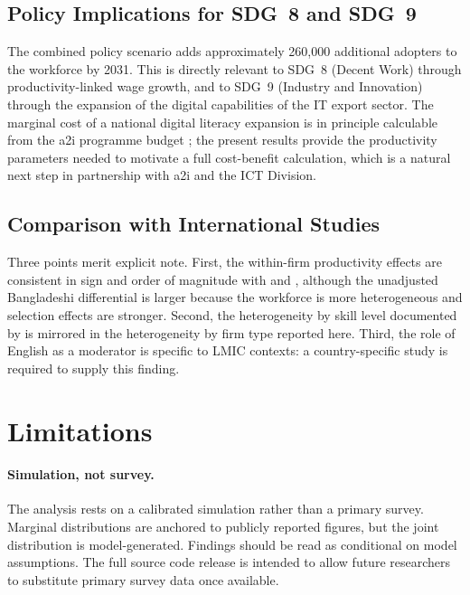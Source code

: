 \documentclass[11pt,a4paper]{article}
\begin{document}
\subsection{Policy Implications for SDG~8 and SDG~9}

The combined policy scenario adds approximately 260{,}000 additional
adopters to the workforce by 2031. This is directly relevant to SDG~8
(Decent Work) through productivity-linked wage growth, and to SDG~9
(Industry and Innovation) through the expansion of the digital
capabilities of the IT export sector. The marginal cost of a national
digital literacy expansion is in principle calculable from the a2i
programme budget \citep{a2iDigitalLiteracy2024}; the present results
provide the productivity parameters needed to motivate a full
cost-benefit calculation, which is a natural next step in partnership
with a2i and the ICT Division.

\subsection{Comparison with International Studies}

Three points merit explicit note. First, the within-firm productivity
effects are consistent in sign and order of magnitude with
\citet{ZieglerEtAl2024} and \citet{CuiDemirerEtAl2025}, although the
unadjusted Bangladeshi differential is larger because the workforce
is more heterogeneous and selection effects are stronger. Second,
the heterogeneity by skill level documented by
\citet{BrynjolfssonLiRaymond2025} is mirrored in the heterogeneity
by firm type reported here. Third, the role of English as a moderator
is specific to LMIC contexts: a country-specific study is required
to supply this finding.

\section{Limitations}

\paragraph{Simulation, not survey.}
The analysis rests on a calibrated simulation rather than a primary
survey. Marginal distributions are anchored to publicly reported
figures, but the joint distribution is model-generated. Findings
should be read as conditional on model assumptions. The full source
code release is intended to allow future researchers to substitute
primary survey data once available.
\end{document}
